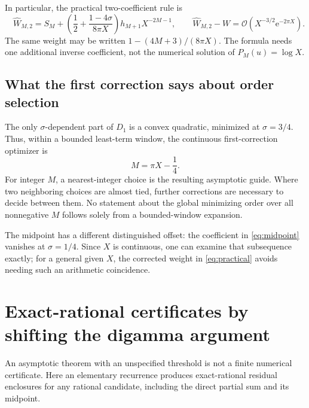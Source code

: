 \documentclass[11pt,a4paper]{article}
\theoremstyle{definition}
\numberwithin{equation}{section}
\newcommand{\e}{\mathrm e}
\newcommand{\Oh}{\mathcal O}
\begin{document}
In particular, the practical two-coefficient rule is
\begin{equation}
 \boxed{\quad
 \widehat W_{M,2}=S_M+
   \left(\frac12+\frac{1-4\sigma}{8\pi X}\right)h_{M+1}X^{-2M-1},
 \qquad
 \widehat W_{M,2}-W=\Oh(X^{-3/2}\e^{-2\pi X}).\quad}
 \label{eq:practical}
\end{equation}
The same weight may be written $1-(4M+3)/(8\pi X)$. The formula needs one additional inverse coefficient, not the numerical solution of $P_M(u)=\log X$.

\subsection{What the first correction says about order selection}
The only $\sigma$-dependent part of $D_1$ is a convex quadratic, minimized at $\sigma=3/4$. Thus, within a bounded least-term window, the continuous first-correction optimizer is
\begin{equation}
 M=\pi X-\frac14.
 \label{eq:orderchoice}
\end{equation}
For integer $M$, a nearest-integer choice is the resulting asymptotic guide. Where two neighboring choices are almost tied, further corrections are necessary to decide between them. No statement about the global minimizing order over all nonnegative $M$ follows solely from a bounded-window expansion.

The midpoint has a different distinguished offset: the coefficient in \eqref{eq:midpoint} vanishes at $\sigma=1/4$. Since $X$ is continuous, one can examine that subsequence exactly; for a general given $X$, the corrected weight in \eqref{eq:practical} avoids needing such an arithmetic coincidence.

\section{Exact-rational certificates by shifting the digamma argument}
\label{sec:certificates}

An asymptotic theorem with an unspecified threshold is not a finite numerical certificate. Here an elementary recurrence produces exact-rational residual enclosures for any rational candidate, including the direct partial sum and its midpoint.
\end{document}
